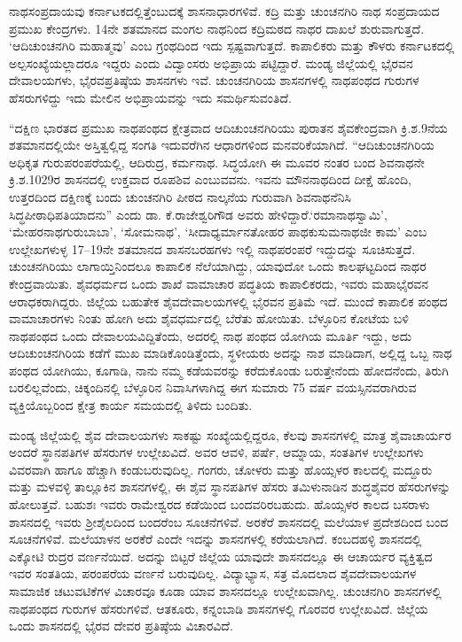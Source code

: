 ನಾಥಸಂಪ್ರದಾಯವು ಕರ್ನಾಟಕದಲ್ಲಿತ್ತೆಂಬುದಕ್ಕೆ ಶಾಸನಾಧಾರಗಳಿವೆ. ಕದ್ರಿ ಮತ್ತು ಚುಂಚನಗಿರಿ ನಾಥ ಸಂಪ್ರದಾಯದ ಪ್ರಮುಖ ಕೇಂದ್ರಗಳು. 14ನೇ ಶತಮಾನದ ಮಂಗಲ ನಾಥನಿಂದ ಕದ್ರಿಮಠದ ನಾಥರ ದಾಖಲೆ ಶುರುವಾಗುತ್ತದೆ. ‘ಆದಿಚುಂಚನಗಿರಿ ಮಹಾತ್ಮವು’ ಎಂಬ ಗ್ರಂಥದಿಂದ ಇದು ಸ್ಪಷ್ಟವಾಗುತ್ತದೆ. ಕಾಪಾಲಿಕರು ಮತ್ತು ಕೌಳರು ಕರ್ನಾಟಕದಲ್ಲಿ ಅಲ್ಪಸಂಖ್ಯೆಯಲ್ಲಾದರೂ ಇದ್ದರು ಎಂದು ವಿದ್ವಾಂಸರು ಅಭಿಪ್ರಾಯ ಪಟ್ಟಿದ್ದಾರೆ. ಮಂಡ್ಯ ಜಿಲ್ಲೆಯಲ್ಲಿ ಭೈರವನ ದೇವಾಲಯಗಳು, ಭೈರವಪ್ರತಿಷ್ಠೆಯ ಶಾಸನಗಳು ಇವೆ. ಚುಂಚನಗಿರಿಯ ಶಾಸನಗಳಲ್ಲಿ ನಾಥಪಂಥದ ಗುರುಗಳ ಹೆಸರುಗಳಿದ್ದು ಇದು ಮೇಲಿನ ಅಭಿಪ್ರಾಯವನ್ನು ಇದು ಸಮರ್ಥಿಸುವಂತಿದೆ.

“ದಕ್ಷಿಣ ಭಾರತದ ಪ್ರಮುಖ ನಾಥಪಂಥದ ಕ್ಷೇತ್ರವಾದ ಆದಿಚುಂಚನಗಿರಿಯು ಪುರಾತನ ಶೈವಕೇಂದ್ರವಾಗಿ ಕ್ರಿ.ಶ.9ನೆಯ ಶತಮಾನದಲ್ಲಿಯೇ ಅಸ್ತಿತ್ವಲ್ಲಿದ್ದ ಸಂಗತಿ ಇದುವರೆಗಿನ ಆಧಾರಗಳಿಂದ ಮನವರಿಕೆಯಾಗಿದೆ. “ಆದಿಚುಂಚನಗಿರಿಯ ಅಧಿಕೃತ ಗುರುಪರಂಪರೆಯಲ್ಲಿ, ಆದಿರುದ್ರ, ಕರ್ಮನಾಥ. ಸಿದ್ಧಯೋಗಿ ಈ ಮೂವರ ನಂತರ ಬಂದ ಶಿವನಾಥನೇ ಕ್ರಿ.ಶ.1029ರ ಶಾಸನದಲ್ಲಿ ಉಕ್ತವಾದ ರೂಪಶಿವ ಎಂಬುವವನು. ಇವನು ಮೌನನಾಥದಿಂದ ದೀಕ್ಷೆ ಹೊಂದಿ, ಉತ್ತರದಿಂದ ದಕ್ಷಿಣಕ್ಕೆ ಬಂದು ಚುಂಚನಗಿರಿ ಪೀಠದ ನಾಲ್ಕನೆಯ ಗುರುವಾಗಿ ಶಿವನಾಥನೆನಿಸಿ ಸಿದ್ಧಪೀಠಾಧಿಪತಿಯಾದನು” ಎಂದು ಡಾ. ಕೆ.ರಾಜೇಶ್ವರಿಗೌಡ ಅವರು ಹೇಳಿದ್ದಾರೆ.‘ರಮಾನಾಥಸ್ವಾಮಿ’, ‘ಮೇಹರನಾಥಗುರುಬಾಬಾ’, ‘ಸೋಮನಾಥ’, ‘ಸೀದಾಧ್ಯರ್ಮಾನತೋಹರ ಪಾಥಕುಸುಮನಾಥಜೀ ಕಾಮ’ ಎಂಬ ಉಲ್ಲೇಖಗಳುಳ್ಳ 17–19ನೇ ಶತಮಾನದ ಶಾಸನಬರಹಗಳು ಇಲ್ಲಿ ನಾಥಪರಂಪರೆ ಇದ್ದುದನ್ನು ಸೂಚಿಸುತ್ತದೆ. ಚುಂಚನಗಿರಿಯು ಲಾಗಾಯ್ತಿನಿಂದಲೂ ಕಾಪಾಲಿಕ ನೆಲೆಯಾಗಿದ್ದು, ಯಾವುದೋ ಒಂದು ಕಾಲಘಟ್ಟದಿಂದ ನಾಥರ ಕೇಂದ್ರವಾಯಿತು. ಶೈವಧರ್ಮದ ಒಂದು ಶಾಖೆ ವಾಮಾಚಾರ ಪದ್ಧತಿಯ ಕಾಪಾಲಿಕರದು, ಇವರು ಮಹಾಭೈರವನ ಆರಾಧಕರಾಗಿದ್ದರು. ಜಿಲ್ಲೆಯ ಬಹುತೇಕ ಶೈವದೇವಾಲಯಗಳಲ್ಲಿ ಭೈರವನ ಪ್ರತಿಮೆ ಇದೆ. ಮುಂದೆ ಕಾಪಾಲಿಕ ಪಂಥದ ವಾಮಾಚಾರಗಳು ನಿಂತು ಹೋಗಿ ಅದು ಶೈವಧರ್ಮದಲ್ಲಿ ಬೆರೆತು ಹೋಯಿತು. ಬೆಳ್ಳೂರಿನ ಕೋಟೆಯ ಬಳಿ ನಾಥಪಂಥದ ಒಂದು ದೇವಾಲಯವಿದ್ದಿತೆಂದು, ಅದರಲ್ಲಿ ನಾಥ ಪಂಥದ ಯೋಗಿಯ ಮೂರ್ತಿ ಇದ್ದು, ಅದು ಆದಿಚುಂಚನಗಿರಿಯ ಕಡೆಗೆ ಮುಖ ಮಾಡಿಕೊಂಡಿತ್ತೆಂದು, ಸ್ಥಳೀಯರು ಅದನ್ನು ನಾಶ ಮಾಡಿದಾಗ, ಅಲ್ಲಿದ್ದ ಒಬ್ಬ ನಾಥ ಪಂಥದ ಯೋಗಿಯು, ಕೂಗಾಡಿ, ನಾನು ನಮ್ಮ ಕಡೆಯವರನ್ನು ಕರೆದುಕೊಂಡು ಬರುತ್ತೇನೆಂದು ಹೋದನೆಂದು, ತಿರುಗಿ ಬರಲಿಲ್ಲವೆಂದು, ಚಿಕ್ಕಂದಿನಲ್ಲಿ ಬೆಳ್ಳೂರಿನ ನಿವಾಸಿಗಳಾಗಿದ್ದ ಈಗ ಸುಮಾರು 75 ವರ್ಷ ವಯಸ್ಸಿನವರಾಗಿರುವ ವ್ಯಕ್ತಿಯೊಬ್ಬರಿಂದ ಕ್ಷೇತ್ರ ಕಾರ್ಯ ಸಮಯದಲ್ಲಿ ತಿಳಿದು ಬಂದಿತು.

ಮಂಡ್ಯ ಜಿಲ್ಲೆಯಲ್ಲಿ ಶೈವ ದೇವಾಲಯಗಳು ಸಾಕಷ್ಟು ಸಂಖ್ಯೆಯಲ್ಲಿದ್ದರೂ, ಕೆಲವು ಶಾಸನಗಳಲ್ಲಿ ಮಾತ್ರ ಶೈವಾಚಾರ್ಯರ ಅಂದರೆ ಸ್ಥಾನಪತಿಗಳ ಹೆಸರುಗಳ ಉಲ್ಲೇಖವಿದೆ. ಅವರ ಆವಳಿ, ಪರ್ಷೆ, ಆಮ್ನಾಯ, ಸಂತತಿಗಳ ಉಲ್ಲೇಖಗಳು ವಿವರವಾಗಿ ಹಾಗೂ ಹೆಚ್ಚಾಗಿ ಕಂಡುಬರುವುದಿಲ್ಲ. ಗಂಗರು, ಚೋಳರು ಮತ್ತು ಹೊಯ್ಸಳರ ಕಾಲದಲ್ಲಿ ಮದ್ದೂರು ಮತ್ತು ಮಳವಳ್ಳಿ ತಾಲ್ಲೂಕಿನ ಶಾಸನಗಳಲ್ಲಿ, ಈ ಶೈವ ಸ್ಥಾನಪತಿಗಳ ಹೆಸರು ತಮಿಳುನಾಡಿನ ಶುದ್ಧಶೈವರ ಹೆಸರುಗಳನ್ನು ಹೋಲುತ್ತವೆ. ಬಹುಶಃ ಇವರು ರಾಮೇಶ್ವರದ ಕಡೆಯಿಂದ ಬಂದವರಿರಬಹುದು. ಹೊಯ್ಸಳರ ಕಾಲದ ಬಸರಾಳು ಶಾಸನದಲ್ಲಿ ಇವರು ಶ‍್ರೀಶೈಲದಿಂದ ಬಂದರೆಂಬ ಸೂಚನೆಗಳಿವೆ. ಅರಕೆರೆ ಶಾಸನದಲ್ಲಿ ಮಲೆಯಾಳ ಪ್ರದೇಶದಿಂದ ಬಂದ ಸೂಚನೆಗಳಿವೆ. ಮಲೆಯಾಳನ ಅರಕೆರೆ ಎಂದೇ ಇದನ್ನು ಶಾಸನಗಳಲ್ಲಿ ಕರೆಯಲಾಗಿದೆ. ಕಂಬದಹಳ್ಳಿ ಶಾಸನದಲ್ಲಿ ಎಕ್ಕೋಟಿ ರುದ್ರರ ವರ್ಣನೆಯಿದೆ. ಅದನ್ನು ಬಿಟ್ಟರೆ ಜಿಲ್ಲೆಯ ಯಾವುದೇ ಶಾಸನದಲ್ಲೂ ಈ ಆಚಾರ್ಯರ ವ್ಯಕ್ತಿತ್ವದ ಇವರ ಸಂತತಿಯ, ಪರಂಪರೆಯ ವರ್ಣನೆ ಬರುವುದಿಲ್ಲ. ವಿದ್ಯಾಭ್ಯಾಸ, ಸತ್ರ ಮೊದಲಾದ ಶೈವದೇವಾಲಯಗಳ ಸಾಮಾಜಿಕ ಚಟುವಟಿಕೆಗಳ ವಿಚಾರವೂ ಕೂಡಾ ಯಾವ ಶಾಸನದಲ್ಲೂ ಉಲ್ಲೇಖವಾಗಿಲ್ಲ. ಚುಂಚನಗಿರಿ ಶಾಸನಗಳಲ್ಲಿ ನಾಥಪಂಥದ ಗುರುಗಳ ಹೆಸರುಗಳಿವೆ. ಆತಕೂರು, ಕನ್ನಂಬಾಡಿ ಶಾಸನಗಳಲ್ಲಿ ಗೊರವರ ಉಲ್ಲೇಖವಿದೆ. ಜಿಲ್ಲೆಯ ಒಂದು ಶಾಸನದಲ್ಲಿ ಭೈರವ ದೇವರ ಪ್ರತಿಷ್ಠೆಯ ವಿಚಾರವಿದೆ.

